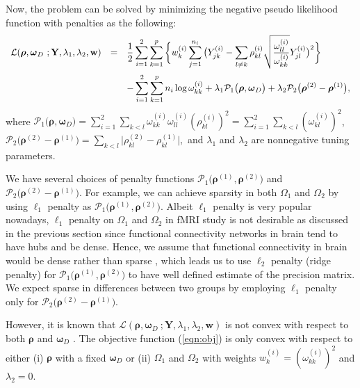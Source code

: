 \documentclass[useAMS,usenatbib,referee]{bio}
\newcommand{\bs}{\boldsymbol}
\begin{document}
{{Now, the problem can be solved by minimizing the negative pseudo likelihood function with penalties as the following:
\begin{equation} \label{eqn:obj}
\begin{array}{lll}  \medskip
{\mathcal L}(\bs{\rho},\bs{\omega}_D~;\mathbf{Y},\lambda_1,\lambda_2,\mathbf{w}) &=& \displaystyle
 \frac{1}{2} \sum_{i=1}^2 \sum_{k=1}^p \bigg\{w^{(i)}_{k} \sum_{j=1}^{n_i} \big(Y_{jk}^{(i)} -  \sum_{l \neq k} \rho^{(i)}_{kl} \sqrt{\frac{\omega^{(i)}_{ll}}{\omega^{(i)}_{kk}}} Y_{jl}^{(i)} \big)^2 \bigg\}  \\
&& \displaystyle 
 -\sum_{i=1}^2 \sum_{k=1}^p n_i \log \omega^{(i)}_{kk} 
+ \lambda_1 \mathcal{P}_1\big( \bs{\rho},\bs{\omega}_D \big) + \lambda_2 \mathcal{P}_2 \big(
 \bs{\rho}^{(2)} - \bs{\rho}^{(1)} \big),
\end{array}
\end{equation}
where $\mathcal{P}_1\big( \bs{\rho},\bs{\omega}_D \big)=\sum_{i=1}^2 \sum_{k<l} \omega^{(i)}_{kk}\omega^{(i)}_{ll}(\rho^{(i)}_{kl})^2 = \sum_{i=1}^2 \sum_{k<l} (\omega^{(i)}_{kl})^2$,
 $ \mathcal{P}_2 \big( \bs{\rho}^{(2)} - \bs{\rho}^{(1)} \big)= \sum_{k<l} \big| \rho^{(2)}_{kl} - \rho^{(1)}_{kl} \big|,$
and  $\lambda_1$ and $\lambda_2$ are nonnegative tuning parameters.

We have several choices of penalty functions  $\mathcal{P}_1\big( \bs{\rho}^{(1)},\bs{\rho}^{(2)} \big)$ and $\mathcal{P}_2 \big(\bs{\rho}^{(2)} - \bs{\rho}^{(1)} \big)$. 
For example, we can achieve sparsity in both $\Omega_1$ and $\Omega_2$ by using $\ell_1$ penalty as $\mathcal{P}_1\big( \bs{\rho}^{(1)},\bs{\rho}^{(2)} \big)$.
Albeit $\ell_1$ penalty is very popular nowadays, $\ell_1$ penalty on $\Omega_1$ and $\Omega_2$  in fMRI study is not desirable as discussed in the previous section since functional connectivity networks in brain tend to have hubs and be dense. 
Hence, we assume that functional connectivity in brain would be dense rather than sparse \citep{Ryali2012}, which leads us to use $\ell_2$ penalty (ridge penalty) for $\mathcal{P}_1\big( \bs{\rho}^{(1)},\bs{\rho}^{(2)} \big)$ to have well defined estimate of the precision matrix. We expect sparse in differences between two groups by employing $\ell_1$ penalty only for $\mathcal{P}_2 \big(
\bs{\rho}^{(2)} - \bs{\rho}^{(1)} \big)$.

However, it is known that ${\mathcal L}(\bs{\rho},\bs{\omega}_D~;\mathbf{Y},\lambda_1,\lambda_2,\mathbf{w})$ is not convex with respect to both $\bs{\rho}$ and $\bs{\omega}_D$ \citep{Khare2014}.
The objective function (\ref{eqn:obj}) is only convex with respect to either 
(i) $\bs{\rho}$ with a fixed $\bs{\omega}_D$ or (ii) $\Omega_1$ and $\Omega_2$ 
with weights $w_{k}^{(i)} = (\omega^{(i)}_{kk})^2$ and $\lambda_2=0$. 

}}
\end{document}
